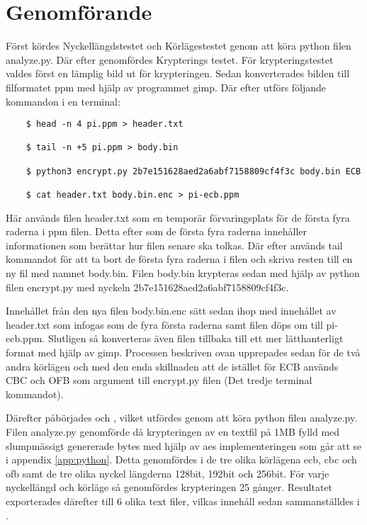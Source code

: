 \section{Genomförande} %
Först kördes Nyckellängdstestet och Körlägestestet genom att köra \gls{python} filen analyze.py. Där efter
genomfördes Krypterings testet. För krypteringstestet valdes först en lämplig bild ut för krypteringen. Sedan
konverterades bilden till filformatet \gls{ppm} med hjälp av programmet \gls{gimp}. Där efter utförs följande kommandon i en terminal:

\begin{verbatim}
    $ head -n 4 pi.ppm > header.txt

    $ tail -n +5 pi.ppm > body.bin

    $ python3 encrypt.py 2b7e151628aed2a6abf7158809cf4f3c body.bin ECB

    $ cat header.txt body.bin.enc > pi-ecb.ppm
\end{verbatim}

Här används filen header.txt som en temporär förvaringsplats för de första fyra raderna i \gls{ppm} filen. Detta
efter som de första fyra raderna innehåller informationen som berättar hur filen senare ska tolkas. Där efter används
tail kommandot för att ta bort de första fyra raderna i filen och skriva resten till en ny fil med namnet body.bin.
Filen body.bin krypteras sedan med hjälp av \gls{python} filen encrypt.py med nyckeln 2b7e151628aed2a6abf7158809cf4f3c.

Innehållet från den nya filen body.bin.enc sätt sedan ihop med innehållet av header.txt som infogas som de fyra första raderna samt filen döps om till pi-ecb.ppm.
Slutligen så konverteras även filen tillbaka till ett mer lätthanterligt format med hjälp av \gls{gimp}.
Processen beskriven ovan upprepades sedan för de två andra körlägen  och  med
den enda skillnaden att de istället för ECB används CBC och OFB som argument till encrypt.py filen (Det tredje terminal kommandot).

Därefter påbörjades  och , vilket utfördes genom att köra
\gls{python} filen analyze.py. Filen analyze.py genomförde då krypteringen av en textfil på 1MB fylld med slumpmässigt genererade \gls{byte}s med hjälp av \acrshort{aes}
implementeringen som går att se i appendix \ref{app:python}. Detta genomfördes i de tre olika körlägena \acrshort{ecb}, \acrshort{cbc} och \acrshort{ofb} samt de tre olika nyckel längderna 128bit, 192bit och 256bit.
För varje nyckellängd och körläge så genomfördes krypteringen 25 gånger. Resultatet exporterades därefter till 6 olika text filer, vilkas innehåll sedan sammanställdes i .
